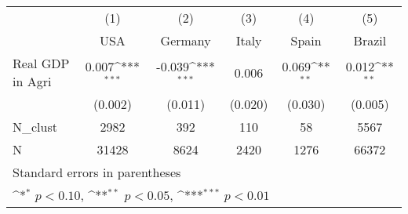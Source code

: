 {
\def\sym#1{\ifmmode^{#1}\else\(^{#1}\)\fi}
\begin{tabular}{l*{5}{c}}
\hline\hline
            &\multicolumn{1}{c}{(1)}&\multicolumn{1}{c}{(2)}&\multicolumn{1}{c}{(3)}&\multicolumn{1}{c}{(4)}&\multicolumn{1}{c}{(5)}\\
            &\multicolumn{1}{c}{USA}&\multicolumn{1}{c}{Germany}&\multicolumn{1}{c}{Italy}&\multicolumn{1}{c}{Spain}&\multicolumn{1}{c}{Brazil}\\
\hline
Real GDP in Agri&       0.007\sym{***}&      -0.039\sym{***}&       0.006         &       0.069\sym{**} &       0.012\sym{**} \\
            &     (0.002)         &     (0.011)         &     (0.020)         &     (0.030)         &     (0.005)         \\
\hline
N\_clust     &        2982         &         392         &         110         &          58         &        5567         \\
N           &       31428         &        8624         &        2420         &        1276         &       66372         \\
\hline\hline
\multicolumn{6}{l}{\footnotesize Standard errors in parentheses}\\
\multicolumn{6}{l}{\footnotesize \sym{*} \(p<0.10\), \sym{**} \(p<0.05\), \sym{***} \(p<0.01\)}\\
\end{tabular}
}
